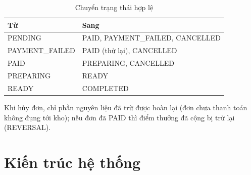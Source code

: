 \documentclass[a4paper]{article}
\begin{document}
\begin{table}[htbp]\centering
\caption{Chuyển trạng thái hợp lệ}\label{tab:state}
\begin{tabular}{@{}p{3.7cm}p{9.1cm}@{}}\toprule
\textbf{Từ} & \textbf{Sang} \\ \midrule
PENDING & PAID, PAYMENT\_FAILED, CANCELLED \\
PAYMENT\_FAILED & PAID (thử lại), CANCELLED \\
PAID & PREPARING, CANCELLED \\
PREPARING & READY \\
READY & COMPLETED \\ \bottomrule
\end{tabular}
\end{table}
Khi hủy đơn, chỉ phần nguyên liệu đã trừ được hoàn lại (đơn chưa thanh toán không đụng tới kho); nếu đơn đã PAID thì điểm thưởng đã cộng bị trừ lại (REVERSAL).

\section{Kiến trúc hệ thống}\label{ch:kientruc}
\end{document}
